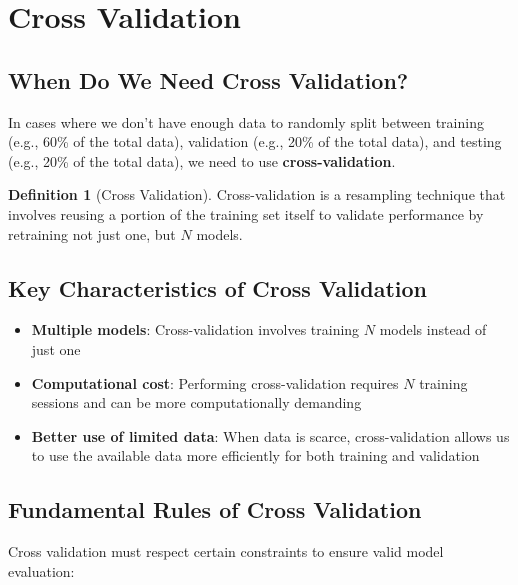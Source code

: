 \documentclass[11pt,a4paper]{article}
\theoremstyle{definition}
\newtheorem{definition}{Definition}[section]
\theoremstyle{plain}
\theoremstyle{remark}
\begin{document}
\section{Cross Validation}

\subsection{When Do We Need Cross Validation?}

In cases where we don't have enough data to randomly split between training (e.g., 60\% of the total data), validation (e.g., 20\% of the total data), and testing (e.g., 20\% of the total data), we need to use \textbf{cross-validation}.

\begin{definition}[Cross Validation]
Cross-validation is a resampling technique that involves reusing a portion of the training set itself to validate performance by retraining not just one, but $N$ models.
\end{definition}

\subsection{Key Characteristics of Cross Validation}

\begin{itemize}
    \item \textbf{Multiple models}: Cross-validation involves training $N$ models instead of just one
    
    \item \textbf{Computational cost}: Performing cross-validation requires $N$ training sessions and can be more computationally demanding
    
    \item \textbf{Better use of limited data}: When data is scarce, cross-validation allows us to use the available data more efficiently for both training and validation
\end{itemize}

\subsection{Fundamental Rules of Cross Validation}

Cross validation must respect certain constraints to ensure valid model evaluation:
\end{document}
